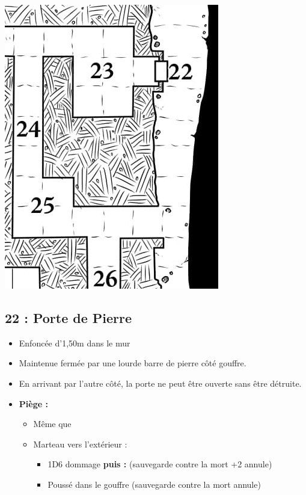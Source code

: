 \vfill
\pagebreak

\includegraphics[width=\columnwidth]{pics/map_22-25.jpg}
\subsection{22 : Porte de Pierre}\label{n3:s22}
\begin{itemize}
  \item Enfoncée d'1,50m dans le mur
  \item Maintenue fermée par une lourde barre de pierre côté gouffre.
  \item En arrivant par l'autre côté, la porte ne peut être ouverte sans être détruite.
  \item \textbf{Piège :}
  \begin{itemize}
    \item Même que 
    \item Marteau vers l'extérieur :
    \begin{itemize}
      \item 1D6 dommage \textbf{puis :} (sauvegarde contre la mort +2 annule)
      \item Poussé dans le gouffre (sauvegarde contre la mort annule)
    \end{itemize}
  \end{itemize}
\end{itemize}

